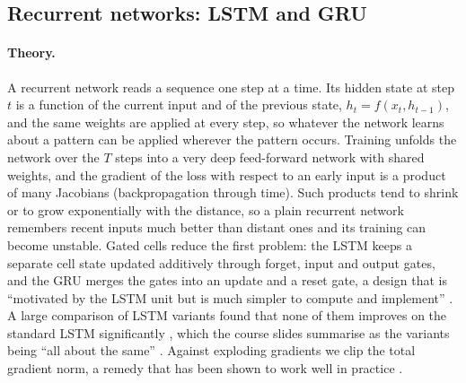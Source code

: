 

\subsection{Recurrent networks: LSTM and GRU}\label{sec:rnn}

\paragraph{Theory.} A recurrent network reads a sequence one step at a time. Its hidden state at step
$t$ is a function of the current input and of the previous state, $h_t = f(x_t, h_{t-1})$, and the same
weights are applied at every step, so whatever the network learns about a pattern can be applied
wherever the pattern occurs. Training unfolds the network over the $T$ steps into a very deep
feed-forward network with shared weights, and the gradient of the loss with respect to an early input is
a product of many Jacobians (backpropagation through time). Such products tend to shrink or to grow
exponentially with the distance, so a plain recurrent network remembers recent inputs much better than
distant ones and its training can become unstable. Gated cells reduce the first problem: the LSTM keeps
a separate cell state updated additively through forget, input and output gates, and the GRU merges the
gates into an update and a reset gate, a design that is ``motivated by the LSTM unit but is much
simpler to compute and implement'' \cite[p.~1725]{cho2014learning}. A large comparison of LSTM variants found
that none of them improves on the standard LSTM significantly \cite[p.~1]{greff2017lstm}, which the course
slides summarise as the variants being ``all about the same'' \cite{course_rnn_slides}. Against
exploding gradients we clip the total gradient norm, a remedy that has been shown to work well in
practice \cite[p.~6]{pascanu2013difficulty}.

